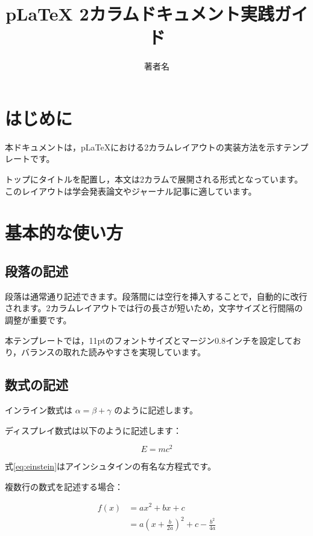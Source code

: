 \documentclass[11pt,a4paper,dvipdfmx,twocolumn]{jarticle}
\title{pLaTeX 2カラムドキュメント実践ガイド}
\author{著者名}
\date{}
\begin{document}
\twocolumn[
    \begin{@twocolumnfalse}
        \maketitle
    \end{@twocolumnfalse}
]

\section{はじめに}

本ドキュメントは，pLaTeXにおける2カラムレイアウトの実装方法を示すテンプレートです。

トップにタイトルを配置し，本文は2カラムで展開される形式となっています。このレイアウトは学会発表論文やジャーナル記事に適しています。

\section{基本的な使い方}

\subsection{段落の記述}

段落は通常通り記述できます。段落間には空行を挿入することで，自動的に改行されます。2カラムレイアウトでは行の長さが短いため，文字サイズと行間隔の調整が重要です。

本テンプレートでは，11ptのフォントサイズとマージン0.8インチを設定しており，バランスの取れた読みやすさを実現しています。

\subsection{数式の記述}

インライン数式は \(\alpha = \beta + \gamma\) のように記述します。

ディスプレイ数式は以下のように記述します：

\begin{equation}
    E = mc^2
    \label{eq:einstein}
\end{equation}

式\ref{eq:einstein}はアインシュタインの有名な方程式です。

複数行の数式を記述する場合：

\begin{align}
    f(x) & = ax^2 + bx + c                                         \\
         & = a\left(x + \frac{b}{2a}\right)^2 + c - \frac{b^2}{4a}
    \label{eq:quadratic}
\end{align}
\end{document}
